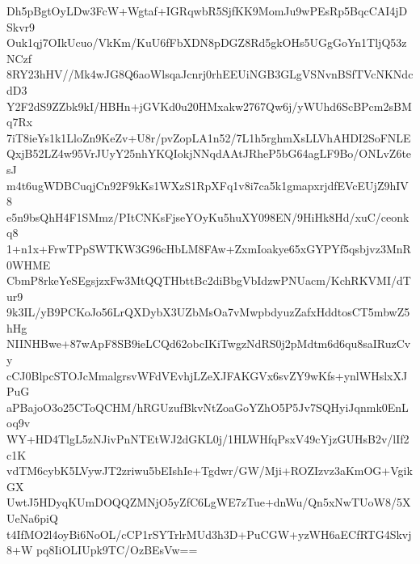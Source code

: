 Dh5pBgtOyLDw3FcW+Wgtaf+IGRqwbR5SjfKK9MomJu9wPEsRp5BqcCAI4jDSkvr9
Ouk1qj7OIkUcuo/VkKm/KuU6fFbXDN8pDGZ8Rd5gkOHs5UGgGoYn1TljQ53zNCzf
8RY23hHV//Mk4wJG8Q6aoWlsqaJcnrj0rhEEUiNGB3GLgVSNvnBSfTVcNKNdcdD3
Y2F2dS9ZZbk9kI/HBHn+jGVKd0u20HMxakw2767Qw6j/yWUhd6ScBPcm2sBMq7Rx
7iT8ieYs1k1LloZn9KeZv+U8r/pvZopLA1n52/7L1h5rghmXsLLVhAHDI2SoFNLE
QxjB52LZ4w95VrJUyY25nhYKQIokjNNqdAAtJRheP5bG64agLF9Bo/ONLvZ6tesJ
m4t6ugWDBCuqjCn92F9kKs1WXzS1RpXFq1v8i7ca5k1gmapxrjdfEVcEUjZ9hIV8
e5n9bsQhH4F1SMmz/PItCNKsFjseYOyKu5huXY098EN/9HiHk8Hd/xuC/ceonkq8
1+n1x+FrwTPpSWTKW3G96cHbLM8FAw+ZxmIoakye65xGYPYf5qsbjvz3MnR0WHME
CbmP8rkeYeSEgsjzxFw3MtQQTHbttBc2diBbgVbIdzwPNUacm/KchRKVMI/dTur9
9k3IL/yB9PCKoJo56LrQXDybX3UZbMsOa7vMwpbdyuzZafxHddtosCT5mbwZ5hHg
NIINHBwe+87wApF8SB9ieLCQd62obcIKiTwgzNdRS0j2pMdtm6d6qu8saIRuzCvy
cCJ0BlpcSTOJcMmalgrsvWFdVEvhjLZeXJFAKGVx6svZY9wKfs+ynlWHslxXJPuG
aPBajoO3o25CToQCHM/hRGUzufBkvNtZoaGoYZhO5P5Jv7SQHyiJqnmk0EnLoq9v
WY+HD4TlgL5zNJivPnNTEtWJ2dGKL0j/1HLWHfqPsxV49cYjzGUHsB2v/lIf2c1K
vdTM6cybK5LVywJT2zriwu5bEIshIe+Tgdwr/GW/Mji+ROZIzvz3aKmOG+VgikGX
UwtJ5HDyqKUmDOQQZMNjO5yZfC6LgWE7zTue+dnWu/Qn5xNwTUoW8/5XUeNa6piQ
t4IfMO2l4oyBi6NoOL/cCP1rSYTrlrMUd3h3D+PuCGW+yzWH6aECfRTG4Skvj8+W
pq8IiOLIUpk9TC/OzBEsVw==
